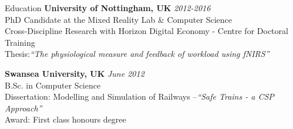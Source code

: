 \documentclass{resume} %
\begin{document}

\begin{rSection}{Education}
{\bf University of Nottingham, UK} \hfill {\em 2012-2016} \\
PhD Candidate at the Mixed Reality Lab \& Computer Science \\
Cross-Discipline Research with Horizon Digital Economy - Centre for Doctoral Training \\
Thesis:\emph{``The physiological measure and feedback of workload using fNIRS''} \smallskip \\
\vspace{-1 mm}

{\bf Swansea University, UK} \hfill {\em June 2012} \\
B.Sc. in Computer Science \\
Dissertation: Modelling and Simulation of Railways –\emph{``Safe Trains - a CSP Approach''}\smallskip \\
Award: First class honours degree

\end{rSection}
\end{document}
